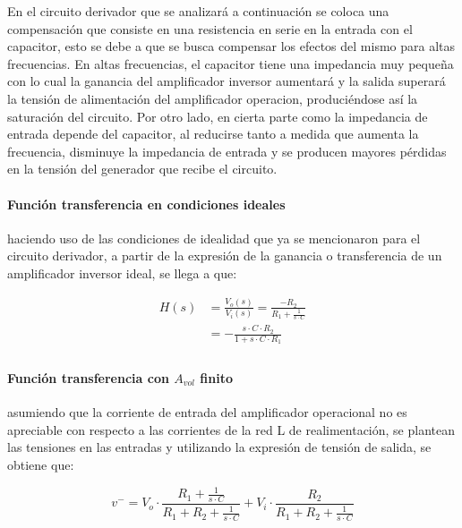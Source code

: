 En el circuito derivador que se analizar\'a a continuaci\'on se coloca una compensaci\'on que consiste en una resistencia en serie en la entrada con el capacitor, esto se debe a que se busca compensar los efectos del mismo para altas frecuencias. En altas frecuencias, el capacitor tiene una impedancia muy peque\~na con lo cual la ganancia del amplificador inversor aumentar\'a y la salida superar\'a la tensi\'on de alimentaci\'on del amplificador operacion, produci\'endose as\'i la saturaci\'on del circuito. Por otro lado, en cierta parte como la impedancia de entrada depende del capacitor, al reducirse tanto a medida que aumenta la frecuencia, disminuye la impedancia de entrada y se producen mayores p\'erdidas en la tensi\'on del generador que recibe el circuito.



\paragraph*{Funci\'on transferencia en condiciones ideales} haciendo uso de las condiciones de idealidad que ya se mencionaron para el circuito derivador, a partir de la expresi\'on de la ganancia o transferencia de un amplificador inversor ideal, se llega a que:

\begin{align*}
		H(s) & = \frac{V_o(s)}{V_i(s)} = \frac{-R_2}{R_1 + \frac{1}{s \cdot C}} \\
		& = - \frac{s \cdot C \cdot R_2}{1 + s \cdot C \cdot R_1} \\
\end{align*}

\paragraph*{Funci\'on transferencia con $A_{vol}$ finito} asumiendo que la corriente de entrada del amplificador operacional no es apreciable con respecto a las corrientes de la red L de realimentaci\'on, se plantean las tensiones en las entradas y utilizando la expresi\'on de tensi\'on de salida, se obtiene que:

\begin{equation*}
	v^{-} = V_o \cdot \frac{R_1 + \frac{1}{s \cdot C}}{R_1 + R_2 + \frac{1}{s \cdot C}} + V_i \cdot \frac{R_2}{R_1+ R_2 + \frac{1}{s \cdot C}}
\end{equation*}

